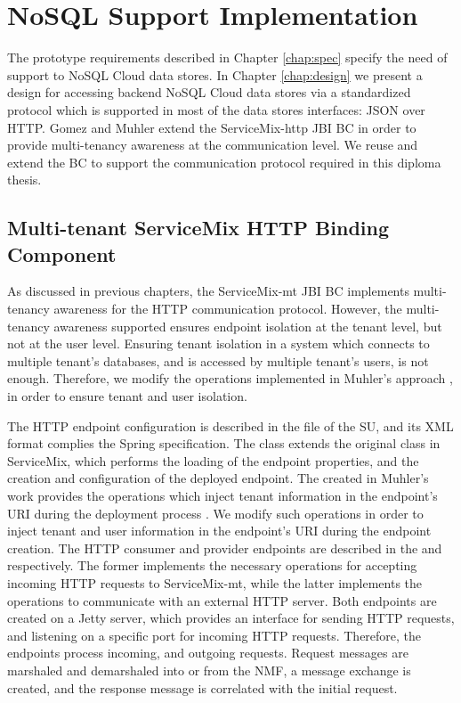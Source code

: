 \section{NoSQL Support Implementation}
\label{sec:implementationnosql}

The prototype requirements described in Chapter \ref{chap:spec} specify the need of support to \ac{NoSQL} Cloud data stores. In Chapter \ref{chap:design} we present a design for accessing backend \ac{NoSQL} Cloud data stores via a standardized protocol which is supported in most of the data stores interfaces: \ac{JSON} over \ac{HTTP}. Gomez \cite{gomez2012} and Muhler \cite{Muhler2012} extend the ServiceMix-http \ac{JBI} \ac{BC} in order to provide multi-tenancy awareness at the communication level. We reuse and extend the \ac{BC} to support the communication protocol required in this diploma thesis.

\subsection{Multi-tenant ServiceMix HTTP Binding Component}

As discussed in previous chapters, the ServiceMix-mt \ac{JBI} \ac{BC} implements multi-tenancy awareness for the \ac{HTTP} communication protocol. However, the multi-tenancy awareness supported ensures endpoint isolation at the tenant level, but not at the user level. Ensuring tenant isolation in a system which connects to multiple tenant's databases, and is accessed by multiple tenant's users, is not enough. Therefore, we modify the operations implemented in Muhler's approach \cite{Muhler2012}, in order to ensure tenant and user isolation. 

The \ac{HTTP} endpoint configuration is described in the  file of the \ac{SU}, and its \ac{XML} format complies the Spring specification. The  class extends the original  class in ServiceMix, which performs the loading of the endpoint properties, and the creation and configuration of the deployed endpoint. The  created in Muhler's work provides the operations which inject tenant information in the endpoint's \ac{URI} during the deployment process \cite{Muhler2012}. We modify such operations in order to inject tenant and user information in the endpoint's \ac{URI} during the endpoint creation. The \ac{HTTP} consumer and provider endpoints are described in the  and  respectively. The former implements the necessary operations for accepting incoming \ac{HTTP} requests to ServiceMix-mt, while the latter implements the operations to communicate with an external \ac{HTTP} server. Both endpoints are created on a Jetty server, which provides an interface for sending \ac{HTTP} requests, and listening on a specific port for incoming \ac{HTTP} requests. Therefore, the endpoints process incoming, and outgoing requests. Request messages are marshaled and demarshaled into or from the \ac{NMF}, a message exchange is created, and the response message is correlated with the initial request.

